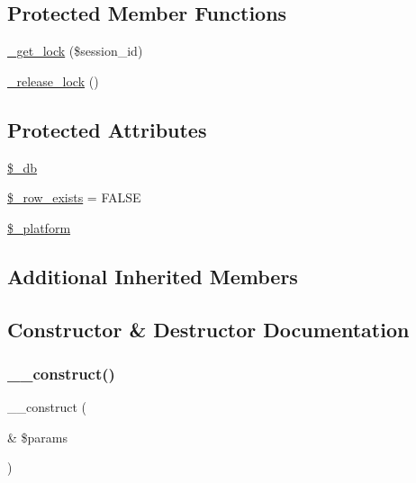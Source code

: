 \subsection*{Protected Member Functions}
\begin{DoxyCompactItemize}
\item 
\mbox{\hyperlink{class_c_i___session__database__driver_a2c49c8e23be3e2aca96a9d20de18ffc2}{\+\_\+get\+\_\+lock}} (\$session\+\_\+id)
\item 
\mbox{\hyperlink{class_c_i___session__database__driver_a0265e356e6cf1eaba229663c1664c37d}{\+\_\+release\+\_\+lock}} ()
\end{DoxyCompactItemize}
\subsection*{Protected Attributes}
\begin{DoxyCompactItemize}
\item 
\mbox{\hyperlink{class_c_i___session__database__driver_abc686c23af6ae116b72bc6adb4482a1f}{\$\+\_\+db}}
\item 
\mbox{\hyperlink{class_c_i___session__database__driver_a73dea3734ad53aa2affc8eb734db5525}{\$\+\_\+row\+\_\+exists}} = F\+A\+L\+SE
\item 
\mbox{\hyperlink{class_c_i___session__database__driver_a991522cf981c79f4faf96b16a91f8a3c}{\$\+\_\+platform}}
\end{DoxyCompactItemize}
\subsection*{Additional Inherited Members}


\subsection{Constructor \& Destructor Documentation}
\mbox{\label{class_c_i___session__database__driver_ac1669c73d53d6f16cf5459a1e84d39c8}} 
\subsubsection{\texorpdfstring{\+\_\+\+\_\+construct()}{\_\_construct()}}
{\footnotesize\ttfamily \+\_\+\+\_\+construct (\begin{DoxyParamCaption}\item[{\&}]{\$params }\end{DoxyParamCaption})}

